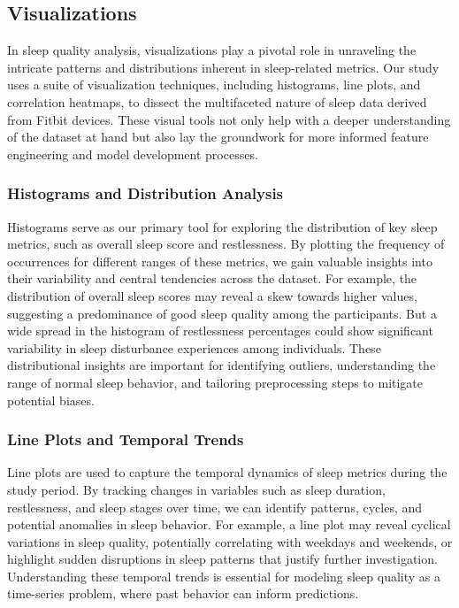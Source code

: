 \documentclass[10pt]{extarticle}
\begin{document}
\subsection{Visualizations}

In sleep quality analysis, visualizations play a pivotal role in unraveling the intricate patterns and distributions inherent in sleep-related metrics. Our study uses a suite of visualization techniques, including histograms, line plots, and correlation heatmaps, to dissect the multifaceted nature of sleep data derived from Fitbit devices. These visual tools not only help with a deeper understanding of the dataset at hand but also lay the groundwork for more informed feature engineering and model development processes.

\subsubsection{Histograms and Distribution Analysis}

Histograms serve as our primary tool for exploring the distribution of key sleep metrics, such as overall sleep score and restlessness. By plotting the frequency of occurrences for different ranges of these metrics, we gain valuable insights into their variability and central tendencies across the dataset. For example, the distribution of overall sleep scores may reveal a skew towards higher values, suggesting a predominance of good sleep quality among the participants. But a wide spread in the histogram of restlessness percentages could show significant variability in sleep disturbance experiences among individuals. These distributional insights are important for identifying outliers, understanding the range of normal sleep behavior, and tailoring preprocessing steps to mitigate potential biases.

\subsubsection{Line Plots and Temporal Trends}

Line plots are used to capture the temporal dynamics of sleep metrics during the study period. By tracking changes in variables such as sleep duration, restlessness, and sleep stages over time, we can identify patterns, cycles, and potential anomalies in sleep behavior. For example, a line plot may reveal cyclical variations in sleep quality, potentially correlating with weekdays and weekends, or highlight sudden disruptions in sleep patterns that justify further investigation. Understanding these temporal trends is essential for modeling sleep quality as a time-series problem, where past behavior can inform predictions.
\end{document}

